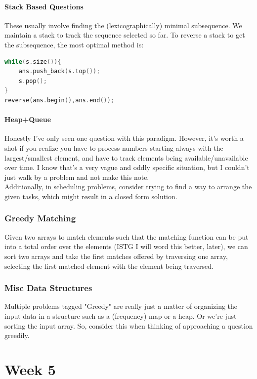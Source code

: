 \documentclass{report}
\begin{document}
\subsubsection*{Stack Based Questions}
These usually involve finding the (lexicographically) minimal
subsequence. We maintain a stack to track the sequence
selected so far. To reverse a stack to get the subsequence, the
most optimal method is:
\begin{lstlisting}[language=C++]
while(s.size()){
    ans.push_back(s.top());
    s.pop();
}
reverse(ans.begin(),ans.end());
\end{lstlisting}
\subsubsection*{Heap+Queue}
Honestly I've only seen one question with this paradigm. However,
it's worth a shot if you realize you have to process numbers
starting always with the largest/smallest element, and have to 
track elements being available/unavailable over time.
I know that's a very vague and oddly specific situation,
but I couldn't just walk by a problem and not make this note.
\\
Additionally, in scheduling problems, consider trying to find
a way to arrange the given tasks, which might result in a
closed form solution.
\subsection{Greedy Matching}
Given two arrays to match elements such that the matching function
can be put into a total order over the elements (ISTG I will word this better,
later), we can sort two arrays and take the first matches offered
by traversing one array, selecting the first matched element with
the element being traversed.
\subsection{Misc Data Structures}
Multiple problems tagged "Greedy" are really just a matter of
organizing the input data in a structure such as a (frequency)
map or a heap. Or we're just sorting the input array.
So, consider this when thinking of approaching 
a question greedily.
\chapter{Week 5}
\end{document}

